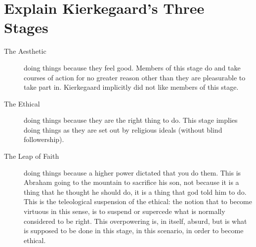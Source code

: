 \section{Explain Kierkegaard's Three Stages}
\begin{description}
  \item[The Aesthetic] doing things because they feel good. Members of this
    stage do and take courses of action for no greater reason other than they
    are pleasurable to take part in. Kierkegaard implicitly did not like members
    of this stage.
  \item[The Ethical] doing things because they are the right thing to do. This
    stage implies doing things as they are set out by religious ideals (without
    blind followership).
  \item[The Leap of Faith] doing things because a higher power dictated that you
    do them. This is Abraham going to the mountain to sacrifice his son, not
    because it is a thing that he thought he should do, it is a thing that god
    told him to do. This is the teleological suspension of the ethical: the
    notion that to become virtuous in this sense, is to suspend or supercede
    what is normally considered to be right. This overpowering is, in itself,
    absurd, but is what is supposed to be done in this stage, in this scenario,
    in order to become ethical.
\end{description}
